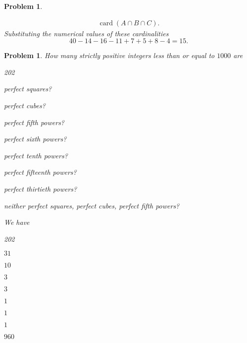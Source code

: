 \documentclass[11pt, openany]{book}
\theoremstyle{change} \theoremheaderfont{\blue\sffamily\bfseries}
\newtheorem{pro}[thm]{Problem}
\theoremstyle{nonumberplain} \theoremheaderfont{\sffamily\bfseries}
\newcommand{\í}{\'{\i}}
\def\card#1{\operatorname{card}\left(#1\right)}
\begin{document}
\begin{multicols}{2}
\begin{pro}
\begin{answer}
$$\begin{array}{lll}
\card{A\cap B \cap C} . \end{array}$$ Substituting the numerical
values of these cardinalities $$ 40 - 14 - 16 - 11 + 7 + 5 + 8 - 4 =
15.
$$
\end{answer}
\end{pro}
         \begin{pro}
How many strictly positive integers less than or equal to $1000$ are
\begin{dingautolist}{202}
\item perfect squares? \item perfect cubes? \item perfect fifth
powers? \item perfect sixth powers? \item perfect tenth powers?
\item perfect fifteenth powers? \item perfect thirtieth powers?
\item neither perfect squares, perfect cubes, perfect fifth
powers?
\end{dingautolist}
\begin{answer}We have
\begin{dingautolist}{202}
\item  $31$ \item  $10$ \item  $3$ \item  $3$ \item  $1$ \item  $1$  \item  $1$ \item  $960$
\end{dingautolist}
\end{answer}
   \end{pro}



\end{multicols}
\end{document}
